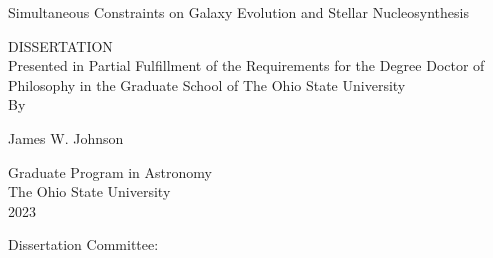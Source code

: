 \documentclass[main.tex]{subfiles}
\begin{document}
\begin{titlepage}

%
%

\singlespace

\begin{center}
\vspace*{1.3cm}
{\Large
Simultaneous Constraints on Galaxy Evolution and Stellar Nucleosynthesis
}
\end{center}

%
%
%
%
%

\vspace*{1.0cm}

\begin{center}
DISSERTATION\\
\vspace*{2.0cm}
\singlespace
Presented in Partial Fulfillment of the Requirements for
the Degree Doctor of Philosophy in the Graduate School of The Ohio 
State University\\
\vspace*{1.0cm}
By\\
\vspace*{0.3cm}

\doublespace

%
%
%



James W. Johnson

\vspace*{0.1cm}
Graduate Program in Astronomy\\
\vspace*{1.0cm}
The Ohio State University\\
2023\\

%
%

\vspace*{2.5cm}

Dissertation Committee:\\
%
%
%


\end{center}
\end{titlepage}
\end{document}
